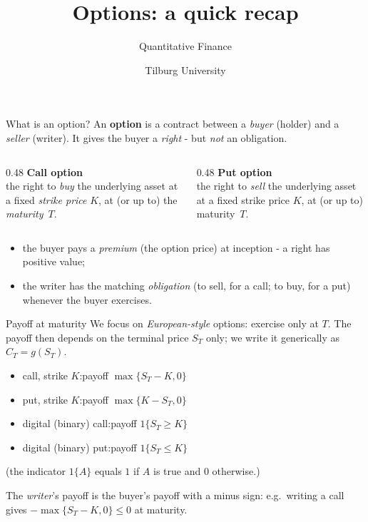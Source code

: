 \documentclass[pdf, handout]{beamer}
\title{Options: a quick recap}
\subtitle{Quantitative Finance}
\author{Tilburg University}
\institute{Ramon van den Akker}
\date{}
\begin{document}
\begin{frame}
\titlepage
\end{frame}


\begin{frame}{What is an option?}
An \textbf{option} is a contract between a \emph{buyer} (holder) and a \emph{seller} (writer). It gives the buyer a \emph{right} - but \emph{not} an obligation.
\medskip
\begin{columns}[T]
\begin{column}{0.48\textwidth}
\textbf{Call option}\\[2pt]
the right to \emph{buy} the underlying asset at a fixed \emph{strike price} $K$, at (or up to) the \emph{maturity}~$T$.
\end{column}
\begin{column}{0.48\textwidth}
\textbf{Put option}\\[2pt]
the right to \emph{sell} the underlying asset at a fixed strike price $K$, at (or up to) maturity~$T$.
\end{column}
\end{columns}
\medskip
\begin{itemize}
\item the buyer pays a \emph{premium} (the option price) at inception - a right has positive value;
\item the writer has the matching \emph{obligation} (to sell, for a call; to buy, for a put) whenever the buyer exercises.
\end{itemize}
\end{frame}

\begin{frame}{Payoff at maturity}
We focus on \emph{European-style} options: exercise only at $T$. The payoff then depends on the terminal price $S_T$ only; we write it generically as $C_T=g(S_T)$.
\medskip
\begin{itemize}
\item call, strike $K$:\qquad payoff $\max\{S_T-K,0\}$
\item put, strike $K$:\qquad payoff $\max\{K-S_T,0\}$
\item digital (binary) call:\qquad payoff $1\{S_T\geq K\}$
\item digital (binary) put:\qquad payoff $1\{S_T\leq K\}$
\end{itemize}
(the indicator $1\{A\}$ equals $1$ if $A$ is true and $0$ otherwise.)
\medskip

The \emph{writer}'s payoff is the buyer's payoff with a minus sign: e.g.\ writing a call gives $-\max\{S_T-K,0\}\leq 0$ at maturity.
\end{frame}
\end{document}

